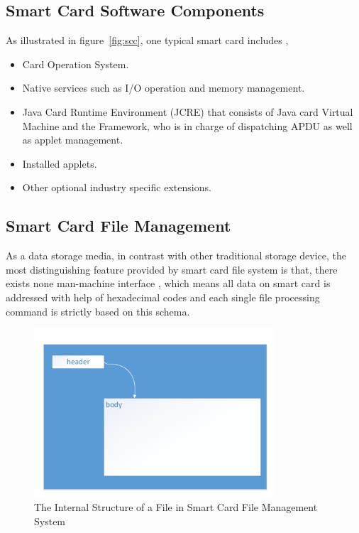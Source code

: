 \subsection{Smart Card Software Components}
As illustrated in figure~\ref{fig:scc}, one typical smart card includes \cite{jcadg},
\begin{itemize}
\item Card Operation System.
\item Native services such as I/O operation and memory management.
\item Java Card Runtime Environment (JCRE) that consists of Java card Virtual Machine and the Framework, who is in charge of dispatching APDU as well as applet management.
\item Installed applets. 
\item Other optional industry specific extensions.
\end{itemize}

\subsection{Smart Card File Management}
As  a data storage media, in contrast with other traditional storage device, the most distinguishing feature provided by smart card file system is that, there exists none man-machine interface \cite{handbuch}, which means all data on smart card is addressed with help of hexadecimal codes and each single file processing command is strictly based on this schema.

\begin{figure}[!htbp]
	\centering
	\includegraphics[width=0.8\textwidth]{file}
		\caption{The Internal Structure of a File in Smart Card File Management System \cite{handbuch}}
	\label{fig:file}
\end{figure}

